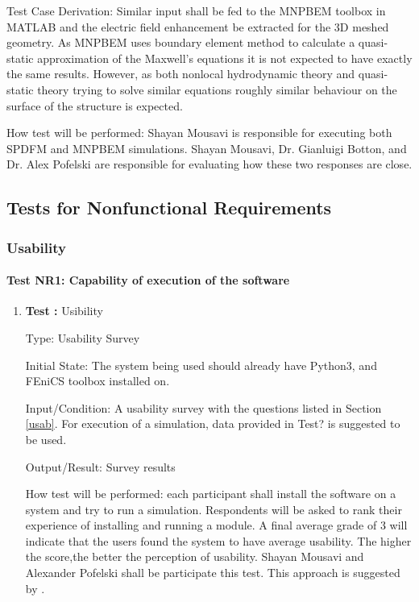 \documentclass[12pt, titlepage]{article}
\begin{document}
\begin{enumerate}
Test Case Derivation: Similar input shall be fed to the MNPBEM toolbox in  MATLAB and the electric field enhancement be extracted for the 3D meshed geometry. As MNPBEM uses boundary element method to calculate a quasi-static approximation of the Maxwell's equations it is not expected to have exactly the same results. However, as both nonlocal hydrodynamic theory and quasi-static theory trying to solve similar equations roughly similar behaviour on the surface of the structure is expected.     

How test will be performed: Shayan Mousavi is responsible for executing both SPDFM and MNPBEM simulations. Shayan Mousavi, Dr. Gianluigi Botton, and Dr. Alex Pofelski are responsible for evaluating how these two responses are close.


\end{enumerate}
	

\subsection{Tests for Nonfunctional Requirements}
\label{nonfunc}

\subsubsection{Usability}
		
\paragraph{Test NR1: Capability of execution of the software}

\begin{enumerate}

\item{\textbf{Test :} Usibility \\}

Type: Usability Survey
					
Initial State: The system being used should already have Python3, and FEniCS toolbox installed on.  
					
Input/Condition: A usability survey with the questions listed in Section \ref{usab}. For execution of a simulation, data provided in Test? is suggested to be used.
					
Output/Result: Survey results
					
How test will be performed: each participant shall install the software on a system and try to run a simulation. Respondents will be asked to rank their experience of installing and running a module. A final average grade of 3 will indicate that the users found the system to have average usability. The higher the score,the better the perception of usability. Shayan Mousavi and Alexander Pofelski shall be participate this test. This approach is suggested by \cite{LatticeB41:online}.

\end{enumerate}
\end{document}
